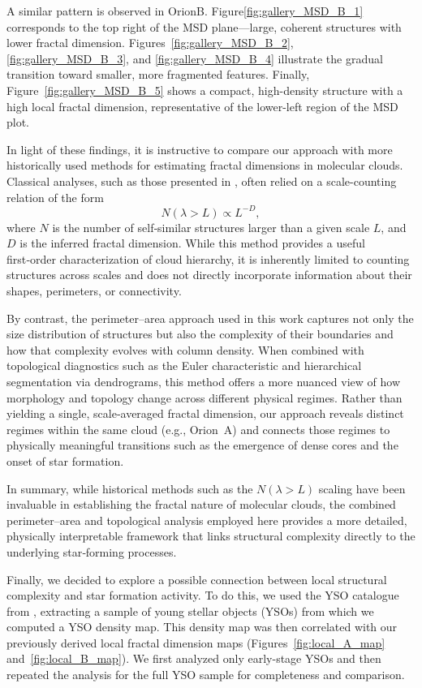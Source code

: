 A similar pattern is observed in OrionB.
Figure\ref{fig:gallery_MSD_B_1} corresponds to the top right of the MSD plane—large, coherent structures with lower fractal dimension.
Figures~\ref{fig:gallery_MSD_B_2}, \ref{fig:gallery_MSD_B_3}, and \ref{fig:gallery_MSD_B_4} illustrate the gradual transition toward smaller, more fragmented features.
Finally, Figure~\ref{fig:gallery_MSD_B_5} shows a compact, high-density structure with a high local fractal dimension, representative of the lower-left region of the MSD plot.

In light of these findings, it is instructive to compare our approach with more historically used methods for estimating fractal dimensions in molecular clouds.  
Classical analyses, such as those presented in \cite{elmegreen1996fractal}, often relied on a scale-counting relation of the form
\[
N(\lambda > L) \propto L^{-D},
\]
where \(N\) is the number of self‑similar structures larger than a given scale \(L\), and \(D\) is the inferred fractal dimension.  
While this method provides a useful first‑order characterization of cloud hierarchy, it is inherently limited to counting structures across scales and does not directly incorporate information about their shapes, perimeters, or connectivity.

By contrast, the perimeter–area approach used in this work captures not only the size distribution of structures but also the complexity of their boundaries and how that complexity evolves with column density.  
When combined with topological diagnostics such as the Euler characteristic and hierarchical segmentation via dendrograms, this method offers a more nuanced view of how morphology and topology change across different physical regimes.  
Rather than yielding a single, scale‑averaged fractal dimension, our approach reveals distinct regimes within the same cloud (e.g., Orion~A) and connects those regimes to physically meaningful transitions such as the emergence of dense cores and the onset of star formation.

In summary, while historical methods such as the \( N(\lambda > L) \) scaling have been invaluable in establishing the fractal nature of molecular clouds, the combined perimeter–area and topological analysis employed here provides a more detailed, physically interpretable framework that links structural complexity directly to the underlying star‑forming processes.

Finally, we decided to explore a possible connection between local structural complexity and star formation activity. To do this, we used the YSO catalogue from \cite{megeath2012catalogue}, extracting a sample of young stellar objects (YSOs) from which we computed a YSO density map. This density map was then correlated with our previously derived local fractal dimension maps (Figures~\ref{fig:local_A_map} and~\ref{fig:local_B_map}). We first analyzed only early-stage YSOs and then repeated the analysis for the full YSO sample for completeness and comparison.

